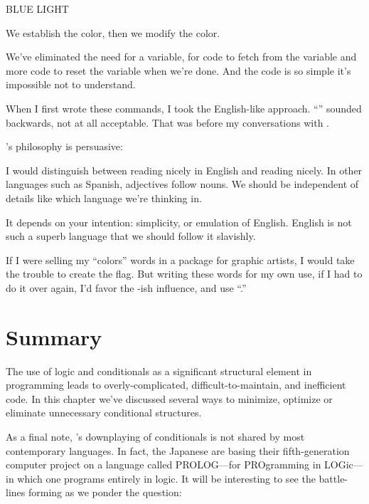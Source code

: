 \begin{Code}
BLUE LIGHT
\end{Code}
We establish the color, then we modify the color.

We've eliminated the need for a variable, for code to fetch from the
variable and more code to reset the variable when we're done. And the
code is so simple it's impossible not to understand.

When I first wrote these commands, I took the English-like approach.
``'' sounded backwards, not at all acceptable. That
was before my conversations with .

\begin{interview}
's philosophy is persuasive:
\begin{tfquot}
I would distinguish between reading nicely in English and reading nicely.
In other languages such as Spanish, adjectives follow nouns. We should be
independent of details like which language we're thinking in.

It depends on your intention: simplicity, or emulation of English. English is
not such a superb language that we should follow it slavishly.
\end{tfquot}
\end{interview}
If I were selling my ``colors'' words in a package for graphic artists, I
would take the trouble to create the flag. But writing these words for my
own use, if I had to do it over again, I'd favor the -ish influence,
and use ``.''%
%

\section{Summary}

The use of logic and conditionals as a significant structural element in
programming leads to overly-complicated, difficult-to-maintain, and
inefficient code. In this chapter we've discussed several ways to minimize,
optimize or eliminate unnecessary conditional structures.

As a final note, \Forth{}'s downplaying of conditionals is not shared
by most contemporary languages. In fact, the Japanese are basing their
fifth-generation computer project on a language called PROLOG---for
PROgramming in LOGic---in which one programs entirely in logic. It will
be interesting to see the battle-lines forming as we ponder the question:

